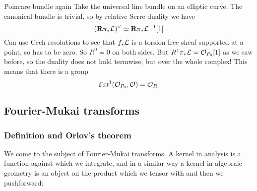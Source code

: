 \begin{example}{Poincare bundle again}{}
Take the universal line bundle on an elliptic curve. The canonical bundle is trivial, so by relative Serre duality we have
\begin{equation*}
    (\mathbf{R}\pi_*\mathcal{L})^\vee \simeq \mathbf{R}\pi_*\mathcal{L}^{-1}[1]
\end{equation*}
Can use Cech resolutions to see that $f_*\mathcal{L}$ is a torsion free sheaf supported at a point, so has to be zero. So $R^0=0$ on both sides. But $R^1\pi_*\mathcal{L}=\mathcal{O}_{P_0}[1]$ as we saw before, so the duality does not hold termwise, but over the whole complex! This means that there is a group
\begin{equation*}
    \operatorname{\mathcal{E}\mathit{xt}}^1(\mathcal{O}_{P_0},\mathcal{O}) = \mathcal{O}_{P_0}
\end{equation*}
\end{example}




\subsection{Fourier-Mukai transforms}
\subsubsection{Definition and Orlov's theorem}
We come to the subject of Fourier-Mukai transforms. A kernel in analysis is a function against which we integrate, and in a similar way a kernel in algebraic geometry is an object on the product which we tensor with and then we pushforward:

